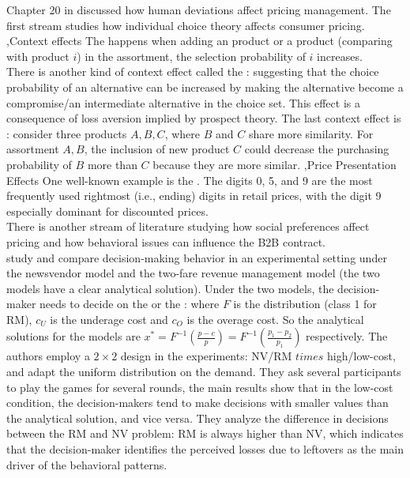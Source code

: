\documentclass[10pt]{report}
\begin{document}
Chapter 20 in \cite{ozer2012oxford} discussed how human deviations affect pricing management. The first stream studies how individual choice theory affects consumer pricing.
\sep{Context effects}
The  happens when adding an  product or a  product (comparing with product $i$) in the assortment, the selection probability of $i$ increases. \\
There is another kind of context effect called the : suggesting that the choice probability of an alternative can be increased by making the alternative become a compromise/an intermediate alternative in the choice set. 
This effect is a consequence of loss aversion implied by prospect theory.
The last context effect is : consider three products $A,B,C$, where $B$ and $C$ share more similarity. For assortment $A, B$, the inclusion of new product $C$ could decrease the purchasing probability of $B$ more than $C$ because they are more similar.
\sep{Price Presentation Effects}
One well-known example is the . The digits 0, 5, and 9 are the most frequently used rightmost (i.e., ending) digits in retail prices, with the digit 9 especially dominant for discounted prices.\\
There is another stream of literature studying how social preferences affect pricing and how behavioral issues can influence the B2B contract. \\

\cite{Kocabiyikoglu2015} study and compare decision-making behavior in an experimental setting under the newsvendor model and the two-fare revenue management model (the two models have a clear analytical solution). 
Under the two models, the decision-maker needs to decide on the  or the :
where $F$ is the distribution (class 1 for RM), $c_U$ is the underage cost and $c_O$ is the overage cost. 
So the analytical solutions for the models are $x^*=F^{-1}\left(\frac{p-c}p\right)=F^{-1}\left(\frac{p_1-p_2}{p_1}\right)$ respectively. 
The authors employ a $2\times 2$ design in the experiments: NV/RM $times$ high/low-cost, and adapt the uniform distribution on the demand. 
They ask several participants to play the games for several rounds, the main results show that in the low-cost condition, the decision-makers tend to make decisions with smaller values than the analytical solution, and vice versa. 
They analyze the difference in decisions between the RM and NV problem: RM is always higher than NV, which indicates that the decision-maker identifies the perceived losses due to leftovers as the main driver of the behavioral patterns.\\
\end{document}
